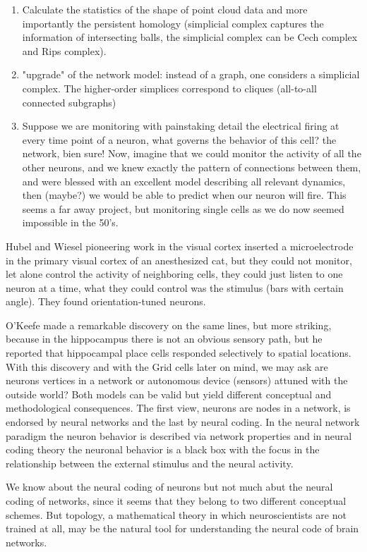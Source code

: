 \documentclass[onecollarge,runningheads]{svjour2}
\begin{document}
\begin{enumerate}
\item  Calculate the statistics of the shape of point cloud data and more importantly the persistent homology (simplicial complex captures the information of intersecting balls, the simplicial complex can be Cech complex and Rips complex).
\item  "upgrade" of the network model: instead of a graph, one considers a simplicial complex. The higher-order simplices correspond to cliques (all-to-all connected subgraphs)
\item Suppose we are monitoring with painstaking detail the electrical firing at every time point of a neuron, what governs the behavior of this cell? the network, bien sure!  Now, imagine that we could monitor the activity of all the other neurons, and we knew exactly the pattern of connections between them, and were blessed with an excellent model describing all relevant dynamics, then (maybe?) we would be able to predict when our neuron will fire. This seems a far away project, but monitoring  single cells as we do now seemed impossible in the 50's. %
\end{enumerate}

Hubel and Wiesel pioneering work in the visual cortex inserted a microelectrode in the primary visual cortex of an anesthesized cat, but they could not monitor, let alone control the activity of neighboring cells, they could just listen to one neuron at a time, what they could control was the stimulus (bars with certain angle). They found orientation-tuned neurons.

O'Keefe made a remarkable discovery on the same lines, but more striking, because in the hippocampus there is not an obvious sensory path, but he reported that hippocampal place cells responded selectively to spatial locations.
With this discovery and with the Grid cells later on mind, we may ask are neurons vertices in a network or autonomous device (sensors) attuned with the outside world? Both models can be valid but yield different conceptual and methodological consequences. The first view, neurons are nodes in a network, is endorsed by neural networks and the last by neural coding. In the neural network paradigm the neuron behavior is described via network properties and in neural coding theory the neuronal behavior is a black box with the focus in the relationship between the external stimulus and the neural activity.

We know about the neural coding of neurons but not much abut the neural coding of networks, since it seems that they belong to two different conceptual schemes. But topology, a mathematical theory in which neuroscientists are not trained at all, may be the natural tool for understanding the neural code of brain networks.
\end{document}
